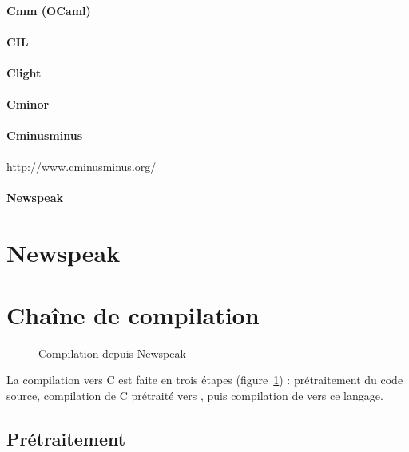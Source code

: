 \paragraph{Cmm (OCaml)}

\paragraph{CIL}

\paragraph{Clight}

\paragraph{Cminor}

\paragraph{Cminusminus}

\cite{spjcmm}

http://www.cminusminus.org/

\paragraph{Newspeak}

\section{Newspeak}

\section{Chaîne de compilation}

\begin{figure}
  
  \caption{Compilation depuis Newspeak}
  \label{fig:compil-npk}
\end{figure}

La compilation vers C est faite en trois étapes (figure~\ref{fig:compil-npk}) :
prétraitement du code source, compilation de C prétraité vers \newspeak{}, puis
compilation de \newspeak{} vers ce langage.

\subsection{Prétraitement}

